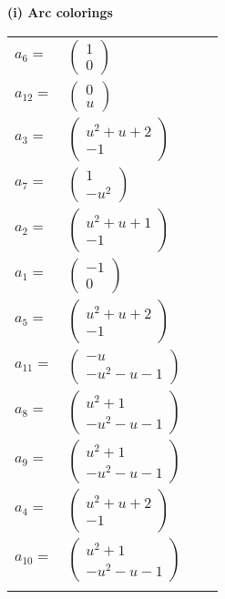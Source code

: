 \documentclass[1p]{elsarticle_modified}
\theoremstyle{definition}
\begin{document}
\flushleft \textbf{(i) Arc colorings}\\
\begin{tabular}{m{7pt} m{180pt} m{7pt} m{180pt} }
\flushright $a_{6}=$&$\begin{pmatrix}1\\0\end{pmatrix}$ \\
\flushright $a_{12}=$&$\begin{pmatrix}0\\u\end{pmatrix}$ \\
\flushright $a_{3}=$&$\begin{pmatrix}u^2+u+2\\-1\end{pmatrix}$ \\
\flushright $a_{7}=$&$\begin{pmatrix}1\\- u^2\end{pmatrix}$ \\
\flushright $a_{2}=$&$\begin{pmatrix}u^2+u+1\\-1\end{pmatrix}$ \\
\flushright $a_{1}=$&$\begin{pmatrix}-1\\0\end{pmatrix}$ \\
\flushright $a_{5}=$&$\begin{pmatrix}u^2+u+2\\-1\end{pmatrix}$ \\
\flushright $a_{11}=$&$\begin{pmatrix}- u\\- u^2- u-1\end{pmatrix}$ \\
\flushright $a_{8}=$&$\begin{pmatrix}u^2+1\\- u^2- u-1\end{pmatrix}$ \\
\flushright $a_{9}=$&$\begin{pmatrix}u^2+1\\- u^2- u-1\end{pmatrix}$ \\
\flushright $a_{4}=$&$\begin{pmatrix}u^2+u+2\\-1\end{pmatrix}$ \\
\flushright $a_{10}=$&$\begin{pmatrix}u^2+1\\- u^2- u-1\end{pmatrix}$\\&\end{tabular}
\end{document}
